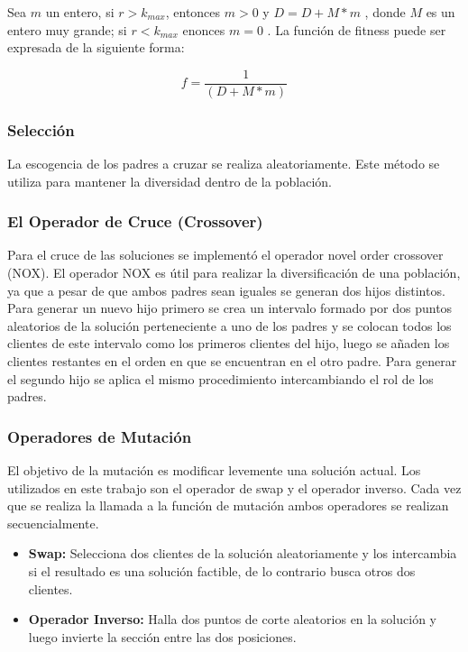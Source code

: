 Sea $m$ un entero, si $r>k_{max}$, entonces $m>0$ y $D = D + M*m$ , donde $M$ es un entero muy grande; si $r < k_{max}$ enonces $m = 0$ . La función de fitness puede ser expresada de la siguiente forma:

\begin{equation}
f =\dfrac{1}{(D + M*m)}
\end{equation}
  

\subsubsection*{Selección}

	La escogencia de los padres a cruzar se realiza aleatoriamente. Este método se utiliza para mantener la diversidad dentro de la población.
	
\subsubsection*{El Operador de Cruce (Crossover)}

	Para el cruce de las soluciones se implementó el operador novel order crossover (NOX). El operador NOX es útil para realizar la diversificación de una población, ya que a pesar de que ambos padres sean iguales se generan dos hijos distintos. Para generar un nuevo hijo primero se crea  un intervalo formado por dos puntos aleatorios de la solución perteneciente a uno de los padres y se colocan todos los clientes de este intervalo como los primeros clientes del hijo, luego se añaden los clientes restantes en el orden en que se encuentran en el otro padre. Para generar el segundo hijo se aplica el mismo procedimiento intercambiando el rol de los padres.


\subsubsection*{Operadores de Mutación}

	El objetivo de la mutación es modificar levemente una solución actual. Los utilizados en este trabajo son el operador de swap y el operador inverso. Cada vez que se realiza la llamada a la función de mutación ambos operadores se realizan secuencialmente.

\begin{itemize}
\item \textbf{Swap:} Selecciona dos clientes de la solución aleatoriamente y los intercambia si el resultado es una solución factible, de lo contrario busca otros dos clientes. 

\item \textbf{Operador Inverso:} Halla dos puntos de corte aleatorios en la solución y luego invierte la sección entre las dos posiciones.
\end{itemize}


